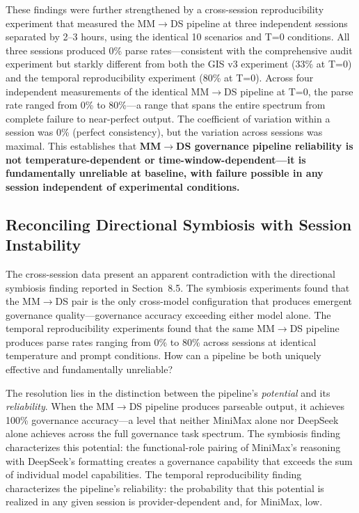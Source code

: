 \documentclass[11pt,a4paper]{article}
\begin{document}
These findings were further strengthened by a cross-session reproducibility experiment that measured the MM$\rightarrow$DS pipeline at three independent sessions separated by 2--3 hours, using the identical 10 scenarios and T=0 conditions. All three sessions produced 0\% parse rates---consistent with the comprehensive audit experiment but starkly different from both the GIS v3 experiment (33\% at T=0) and the temporal reproducibility experiment (80\% at T=0). Across four independent measurements of the identical MM$\rightarrow$DS pipeline at T=0, the parse rate ranged from 0\% to 80\%---a range that spans the entire spectrum from complete failure to near-perfect output. The coefficient of variation within a session was 0\% (perfect consistency), but the variation across sessions was maximal. This establishes that \textbf{MM$\rightarrow$DS governance pipeline reliability is not temperature-dependent or time-window-dependent---it is fundamentally unreliable at baseline, with failure possible in any session independent of experimental conditions.}

\subsection{Reconciling Directional Symbiosis with Session Instability}

The cross-session data present an apparent contradiction with the directional symbiosis finding reported in Section~8.5. The symbiosis experiments found that the MM$\rightarrow$DS pair is the only cross-model configuration that produces emergent governance quality---governance accuracy exceeding either model alone. The temporal reproducibility experiments found that the same MM$\rightarrow$DS pipeline produces parse rates ranging from 0\% to 80\% across sessions at identical temperature and prompt conditions. How can a pipeline be both uniquely effective and fundamentally unreliable?

The resolution lies in the distinction between the pipeline's \textit{potential} and its \textit{reliability}. When the MM$\rightarrow$DS pipeline produces parseable output, it achieves 100\% governance accuracy---a level that neither MiniMax alone nor DeepSeek alone achieves across the full governance task spectrum. The symbiosis finding characterizes this potential: the functional-role pairing of MiniMax's reasoning with DeepSeek's formatting creates a governance capability that exceeds the sum of individual model capabilities. The temporal reproducibility finding characterizes the pipeline's reliability: the probability that this potential is realized in any given session is provider-dependent and, for MiniMax, low.
\end{document}
